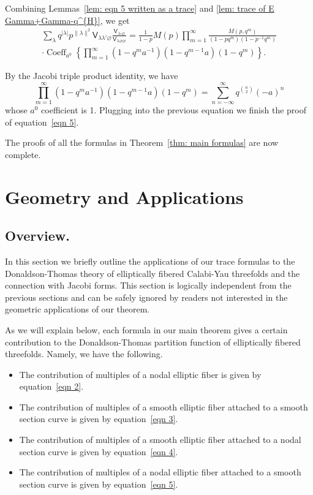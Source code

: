 \documentclass[12pt]{amsart}
\newcommand{\Vsf}{\mathsf{V}}
\newcommand{\bx}{\square}
\renewcommand{\emptyset}{\varnothing}
\theoremstyle{definition}
\begin{document}
Combining Lemmas~\ref{lem: eqn 5 written as a trace} and \ref{lem:
trace of E Gamma+Gamma-q^{H}}, we get
\begin{multline*}
\sum_{\lambda} q^{|\lambda |} p^{\| \lambda \|  ^{2}} \Vsf_{\lambda \lambda' \emptyset} \frac{\Vsf_{\lambda
\bx \emptyset}}{\Vsf_{\lambda \emptyset \emptyset}} =\frac{1}{1-p} M(p)\prod_{m=1}^{\infty}
\frac{M(p,q^{m})}{(1-pq^{m})(1-p^{-1}q^{m})}\\
 \cdot \operatorname{Coeff}_{a^{0}}\left\{\prod_{m=1}^{\infty}
(1-q^{m}a^{-1})(1-q^{m-1}a)(1-q^{m}) \right\}.
\end{multline*}

By the Jacobi triple product identity, we have
\[
\prod_{m=1}^{\infty} (1-q^{m}a^{-1})(1-q^{m-1}a)(1-q^{m}) =
\sum_{n=-\infty}^{\infty} q^{\binom{n}{2}} (-a)^{n}
\]
whose $a^{0}$ coefficient is 1. Plugging into the previous equation we
finish the proof of equation~\eqref{eqn 5}.

The proofs of all the formulas in Theorem~\ref{thm: main formulas} are
now complete. 

\section{Geometry and Applications}\label{sec: geometry and applications}


\subsection{Overview.} In this section we briefly outline the
applications of our trace formulas to the Donaldson-Thomas theory of
elliptically fibered Calabi-Yau threefolds
\cite{Bryan-K3xE,Bryan-Kool,BOPY} and the connection with Jacobi
forms. This section is logically independent from the previous
sections and can be safely ignored by readers not interested in the
geometric applications of our theorem.

As we will explain below, each formula in our main theorem gives a
certain contribution to the Donaldson-Thomas partition function of
elliptically fibered threefolds. Namely, we have the following.
\begin{itemize}
\item The contribution of multiples of a nodal elliptic fiber is given
by equation~\eqref{eqn 2}.
\item The contribution of multiples of a smooth elliptic fiber
attached to a smooth section curve is given by equation~\eqref{eqn 3}.
\item The contribution of multiples of a smooth elliptic fiber
attached to a nodal section curve is given by equation~\eqref{eqn 4}.
\item The contribution of multiples of a nodal elliptic fiber
attached to a smooth section curve is given by equation~\eqref{eqn 5}.
\end{itemize}
\end{document}
